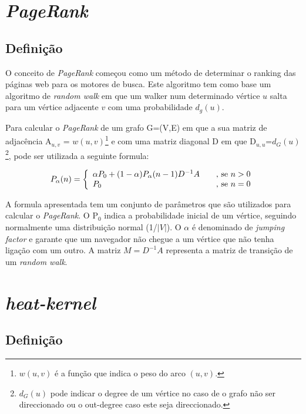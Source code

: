 \documentclass[a4paper,10pt]{article}
\begin{document}
\section*{\textit{PageRank}}

  \subsection*{Definição}\label{pr}

  O conceito de \textit{PageRank} começou como um método de determinar o ranking das páginas web para os motores de busca. 
  Este algoritmo tem como base um algoritmo de \textit{random walk} em que um walker num determinado vértice $u$ salta para um vértice adjacente $v$ com uma probabilidade $d_g(u)$.
  
  Para calcular o \textit{PageRank} de um grafo G=(V,E) em que a sua matriz de adjacência A$_{u,v}$ = $w(u,v)$\footnote{$w(u,v)$ é a função que indica o peso do arco $(u,v)$.} e com uma matriz diagonal D em que D$_{u,u}$=$d_G(u)$\footnote{$d_G(u)$ pode indicar o degree de um vértice no caso de o grafo não ser direccionado ou o out-degree caso este seja direccionado.}, pode ser utilizada a seguinte formula:
  
\[ P_\alpha(n) = \left\{
  \begin{array}{l l}
    \alpha P_0+(1-\alpha)P_\alpha(n-1)D^{{-}1}A & \quad \text{, se } n>0   \\
    P_0 & \quad \text{, se }n=0 
  \end{array} \right.\]
  
  A formula apresentada tem um conjunto de parâmetros que são utilizados para calcular o \textit{PageRank}. O P$_0$ indica a probabilidade inicial de um vértice, seguindo normalmente uma distribuição normal (1/$|V|$). O $\alpha$ é denominado de \textit{jumping factor} e garante que um navegador não chegue a um vértice que não tenha ligação com um outro. A matriz $M=D^{{-}1}A$ representa a matriz de transição de um \textit{random walk}.
  
  
\section*{\textit{heat-kernel}}

  \subsection*{Definição}
  
\end{document}
